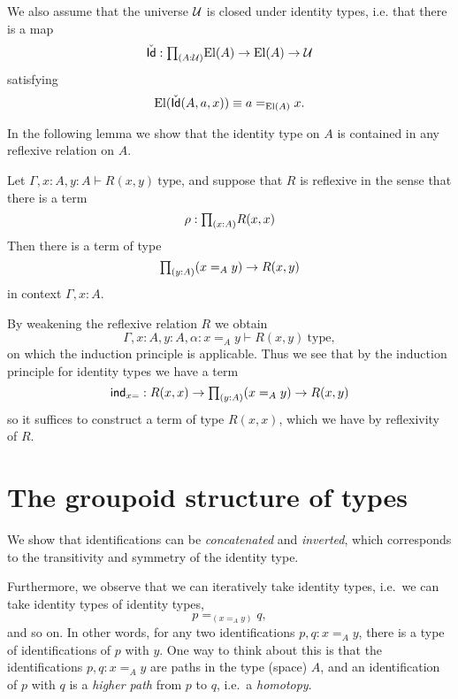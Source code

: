 We also assume that the universe $\mathcal{U}$ is closed under identity types, i.e. that there is a map
\begin{equation*}
\check{\mathsf{Id}}:\prd{A:\UU}\mathrm{El}(A)\to\mathrm{El}(A)\to\UU
\end{equation*}
satisfying
\begin{equation*}
\mathrm{El}(\check{\mathsf{Id}}(A,a,x))\equiv a=_{\mathrm{El}(A)} x.
\end{equation*}

In the following lemma we show that the identity type on $A$ is contained in any reflexive relation on $A$.

\begin{lem}
Let $\Gamma,x:A,y:A\vdash R(x,y)~\mathrm{type}$, and suppose that $R$ is reflexive in the sense that there is a term
\begin{equation*}
\rho:\prd{x:A}R(x,x)
\end{equation*}
Then there is a term of type
\begin{equation*}
\prd{y:A} (x=_A y)\to R(x,y)
\end{equation*}
in context $\Gamma,x:A$.
\end{lem}

\begin{constr}
By weakening the reflexive relation $R$ we obtain
\begin{equation*}
\Gamma,x:A,y:A,\alpha:x=_A y\vdash R(x,y)~\mathrm{type},
\end{equation*}
on which the induction principle is applicable.
Thus we see that by the induction principle for identity types we have a term
\begin{equation*}
\ind{x=} : R(x,x)\to \prd{y:A}(x=_A y)\to R(x,y)
\end{equation*}
so it suffices to construct a term of type $R(x,x)$, which we have by reflexivity of $R$.
\end{constr}

\section{The groupoid structure of types}\label{sec:groupoid}
We show that identifications can be \emph{concatenated} and \emph{inverted}, which corresponds to the transitivity and symmetry of the identity type. 

Furthermore, we observe that we can iteratively take identity types, i.e.~we can take identity types of identity types, 
\begin{equation*}
p =_{(x=_Ay)} q,
\end{equation*}
and so on. In other words, for any two identifications $p,q:x=_A y$, there is a type of identifications of $p$ with $y$. One way to think about this is that the identifications $p,q:x=_A y$ are paths in the type (space) $A$, and an identification of $p$ with $q$ is a \emph{higher path} from $p$ to $q$, i.e.~a \emph{homotopy}.

